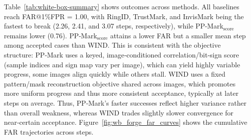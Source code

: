 \documentclass{article}
\theoremstyle{plain}
\theoremstyle{definition}
\theoremstyle{remark}
\begin{document}
Table~\ref{tab:white-box-summary} shows outcomes across methods. All baselines reach FAR@1\%FPR = 1.00, with RingID, TrustMark, and InvisMark being the fastest to break (2.26, 2.41, and 3.07 steps, respectively), while PP-Mark$_{\mathrm{score}}$ remains lower (0.76).  PP‑Mark$_{\mathrm{score}}$ attains a lower FAR but a smaller mean step among accepted cases
than WIND. This is consistent with the objective structure: PP‑Mark uses a keyed, image‑conditioned correlation/bit‑sign score (sample indices and sign map vary per image), which can yield highly variable progress, some images align quickly while others stall. WIND uses a fixed pattern/mask reconstruction objective shared across images, which promotes more uniform progress and thus more consistent acceptance, typically at later steps on average. Thus, PP‑Mark’s faster successes reflect higher variance rather than overall weakness, whereas WIND trades slightly slower convergence for near‑certain acceptance. Figure~\ref{fig:wb_forge_far_curves} shows the cumulative FAR trajectories across steps. 
  
\end{document}
